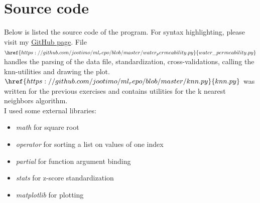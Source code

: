 \documentclass[a4paper]{article}
\begin{document}
\newpage
\section{Source code}
Below is listed the source code of the program. For syntax highlighting, please visit my \href{https://github.com/jootimo/ml_repo}{GitHub page}. File $\href{https://github.com/jootimo/ml_repo/blob/master/water_permeability.py}{water\_permeability.py}$ handles the parsing of the data file, standardization, cross-validations, calling the knn-utilities and drawing the plot. $\href{https://github.com/jootimo/ml_repo/blob/master/knn.py}{knn.py}$ was written for the previous exercises and contains utilities for the k nearest neighbors algorithm.\\

I used some external libraries:
\begin{itemize}
\item \emph{math} for square root
\item \emph{operator} for sorting a list on values of one index
\item \emph{partial} for function argument binding
\item \emph{stats} for z-score standardization
\item \emph{matplotlib} for plotting
\end{itemize}

\vspace*{1cm}

\renewcommand{\sfdefault}{pcr}
\selectfont
\end{document}

